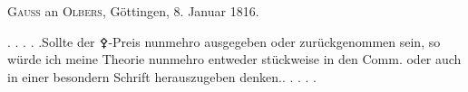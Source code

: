 \par{}\bigskip
\begin{center}
\textsc{Gauss} an \textsc{Olbers}, Göttingen, 8. Januar 1816.
\end{center}
\noindent\hspace*{\parindent}. . . . .\quad Sollte der {\AstroSymbols ⚴}-Preis nunmehro ausgegeben oder zurückgenommen sein, so würde ich meine Theorie nunmehro entweder stückweise in den Comm. oder auch in einer besondern Schrift herauszugeben denken.\quad . . . . .
\par
